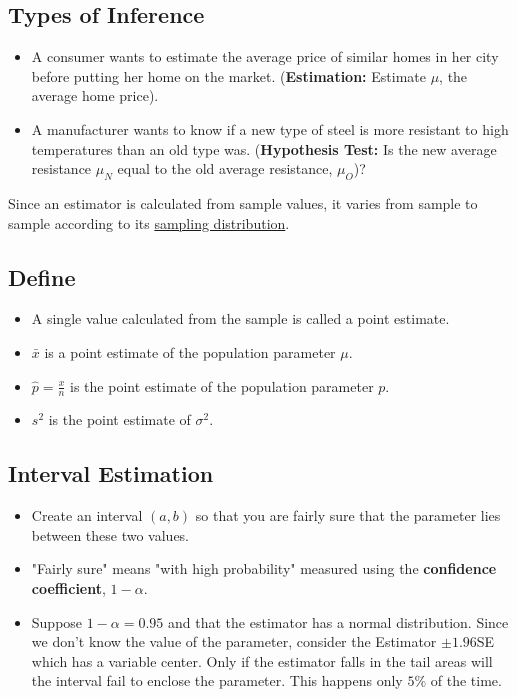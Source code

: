 \documentclass[12pt, letterpaper]{article}
\begin{document}
        \subsection*{Types of Inference}
            \begin{itemize}
                \item A consumer wants to estimate the average price of similar homes in her city before putting her home on the market. (\textbf{Estimation:} Estimate $\mu$, the average home price).
                \item A manufacturer wants to know if a new type of steel is more resistant to high temperatures than an old type was. (\textbf{Hypothesis Test:} Is the new average resistance $\mu_N$ equal to the old average resistance, $\mu_O$)?
            \end{itemize}
            Since an estimator is calculated from sample values, it varies from sample to sample according to its \underline{sampling distribution}.
        \subsection*{Define}
            \begin{itemize}
                \item A single value calculated from the sample is called a point estimate.
                \item $\bar{x}$ is a point estimate of the population parameter $\mu$.
                \item $\hat{p} = \frac{x}{n}$ is the point estimate of the population parameter $p$.
                \item $s^2$ is the point estimate of $\sigma^2$.
            \end{itemize}
        \subsection{Interval Estimation}
            \begin{itemize}
                \item Create an interval $(a, b)$ so that you are fairly sure that the parameter lies between these two values.
                \item "Fairly sure" means "with high probability" measured using the \textbf{confidence coefficient}, $1 - \alpha$.
                \item Suppose $1 - \alpha = 0.95$ and that the estimator has a normal distribution. Since we don't know the value of the parameter, consider the Estimator $\pm 1.96$SE which has a variable center. Only if the estimator falls in the tail areas will the interval fail to enclose the parameter. This happens only $5\%$ of the time. 
            \end{itemize}
\end{document}
